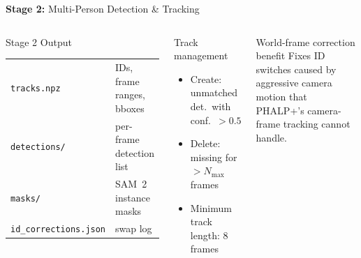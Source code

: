 \documentclass[aspectratio=169,11pt]{beamer}
\newcommand{\stage}[2]{\textcolor{accentblue}{\textbf{Stage #1:}} #2}
\begin{document}
\begin{frame}{\stage{2}{Multi-Person Detection \& Tracking}}
\begin{columns}[T]
      \begin{block}{Stage 2 Output}
        \footnotesize
        \begin{tabular}{ll}
          \texttt{tracks.npz} & IDs, frame ranges, bboxes\\
          \texttt{detections/} & per-frame detection list\\
          \texttt{masks/} & SAM~2 instance masks\\
          \texttt{id\_corrections.json} & swap log\\
        \end{tabular}
      \end{block}
      \vspace{0.5em}
      \begin{block}{Track management}
        \footnotesize
        \begin{itemize}
          \item Create: unmatched det.\ with conf.\ $>0.5$
          \item Delete: missing for $>N_{\max}$ frames
          \item Minimum track length: 8 frames
        \end{itemize}
      \end{block}
      \vspace{0.5em}
      \begin{alertblock}{World-frame correction benefit}
        \small Fixes ID switches caused by aggressive camera motion that PHALP+'s camera-frame tracking cannot handle.
      \end{alertblock}
  \end{columns}
\end{frame}
\end{document}

